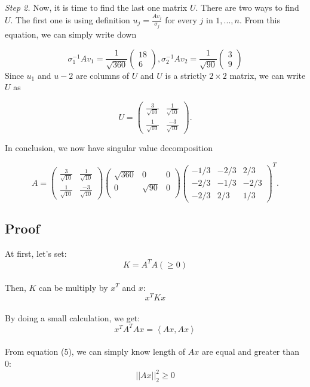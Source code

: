 \documentclass{article}
\begin{document}
\textit{Step 2.} Now, it is time to find the last one matrix $U$. There are two ways to find $U$. The first one is using definition $u_j = \frac{Av_j}{\sigma_j} $ for every $j$ in $1,...,n$. From this equation, we can simply write down

\[\sigma_1^{-1} Av_1 = \frac{1}{\sqrt{360}} 
	\begin{pmatrix}
		18 \\
		6
	\end{pmatrix},
	\sigma_2^{-1} Av_2 = \frac{1}{\sqrt{90}} 
	\begin{pmatrix}
		3 \\
		9
	\end{pmatrix}\]
Since $u_1$ and $u-2$ are columns of $U$ and $U$ is a strictly $2 \times 2$ matrix, we can write $U$ as 

\[U= 
\begin{pmatrix}
	\frac{3}{\sqrt{10}} & \frac{1}{\sqrt{10}} \\
	\frac{1}{\sqrt{10}} & \frac{-3}{\sqrt{10}}  
\end{pmatrix}.\]

\vspace{1mm} 

In conclusion, we now have singular value decomposition

\[A= 
\begin{pmatrix}
	\frac{3}{\sqrt{10}} & \frac{1}{\sqrt{10}} \\
	\frac{1}{\sqrt{10}} & \frac{-3}{\sqrt{10}}  
\end{pmatrix}
\begin{pmatrix}
	\sqrt{360} & 0 & 0 \\
	0 & \sqrt{90} & 0 \\
\end{pmatrix}
\begin{pmatrix}
	-1/3 & -2/3 & 2/3 \\
	-2/3 & -1/3 & -2/3 \\
	-2/3 & 2/3 & 1/3 
\end{pmatrix}^T.\]

 \subsection{Proof}
At first, let's set:
\begin{equation}
	K = A^T A (\geq 0)
\end{equation}
\\
Then, $K$ can be multiply by $x^T$ and $x$:
\begin{equation}
	x^T K x
\end{equation}
\\
By doing a small calculation, we get:
\begin{equation}
	x^T A^T A x = \left\langle Ax, Ax \right\rangle
\end{equation}
\\
From equation (5), we can simply know length of $Ax$  are equal and  greater than $0$:
\begin{equation}\label{eq:Ax-norm}
	||Ax||_2^2 \geq 0
\end{equation}
\end{document}
